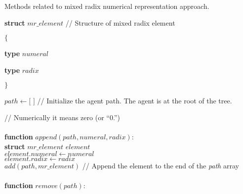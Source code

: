 \begin{algorithm}
\caption{Methods related to mixed radix numerical representation approach.}
\label{pseudocode_2}
\begin{algorithmic}

\State \textbf{struct} $mr\_element$ \hspace{0.5cm} \slash\slash \hspace{0.1cm} Structure of mixed radix element

\State $\{$

\State \hspace{0.3cm} \textbf{type} $numeral$

\State \hspace{0.3cm} \textbf{type} $radix$

\State $\}$

\State $path \gets [$ $]$ \hspace{2.05cm} \slash\slash \hspace{0.1cm} Initialize the agent path. The agent is at the root of the tree.

\State \hspace{3.95cm} \slash\slash \hspace{0.1cm} Numerically it means zero (or ``0.'')\\

\\

\textbf{function} $append(path, numeral, radix)$:\\

\hspace{0.3cm} \textbf{struct} $mr\_element$ $element$\\

\hspace{0.3cm} $element.numeral \gets numeral$\\

\hspace{0.3cm} $element.radix \gets radix$\\

\hspace{0.3cm} $add(path, mr\_element)$ \hspace{0.5cm} \slash\slash \hspace{0.1cm} Append the element to the end of the \textit{path} array\\

\\

\textbf{function} $remove(path)$:\\


\end{algorithmic}
\end{algorithm}
